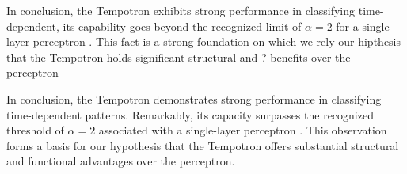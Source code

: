 In conclusion, the Tempotron exhibits strong performance in classifying time-dependent, its capability goes beyond the recognized limit of \( \alpha = 2 \) for a single-layer perceptron \cite{gutig2006tempotron}. This fact is a strong foundation on which we rely our hipthesis that the Tempotron holds significant structural and ? benefits over the perceptron

In conclusion, the Tempotron demonstrates strong performance in classifying time-dependent patterns. Remarkably, its capacity surpasses the recognized threshold of \( \alpha = 2 \) associated with a single-layer perceptron \cite{gutig2006tempotron}. This observation forms a basis for our hypothesis that the Tempotron offers substantial structural and functional advantages over the perceptron.
